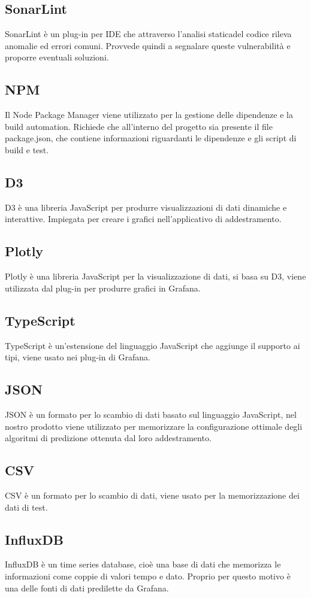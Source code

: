 	\subsection{SonarLint}
		SonarLint è un plug-in per IDE che attraverso l'analisi statica\glosp del codice rileva anomalie ed errori comuni. Provvede quindi a segnalare queste vulnerabilità e proporre eventuali soluzioni.
	\subsection{NPM}
		Il Node Package Manager viene utilizzato per la gestione delle dipendenze e la build automation.
		Richiede che all'interno del progetto sia presente il file package.json, che contiene informazioni riguardanti le dipendenze e gli script di build e test.
	\subsection{D3}
		D3 è una libreria JavaScript per produrre visualizzazioni di dati dinamiche e interattive. Impiegata per creare i grafici nell'applicativo di addestramento.
	\subsection{Plotly}
		Plotly è una libreria JavaScript per la visualizzazione di dati, si basa su D3, viene utilizzata dal plug-in per produrre grafici in Grafana\glo.
	\subsection{TypeScript}
		TypeScript è un'estensione del linguaggio JavaScript che aggiunge il supporto ai tipi, viene usato nei plug-in di Grafana\glo.
	\subsection{JSON}
		JSON è un formato per lo scambio di dati basato sul linguaggio JavaScript, nel nostro prodotto viene utilizzato per memorizzare la configurazione ottimale degli algoritmi di predizione ottenuta dal loro addestramento.
	\subsection{CSV}
		CSV è un formato per lo scambio di dati, viene usato per la memorizzazione dei dati di test.
	\subsection{InfluxDB}
		InfluxDB è un time series database, cioè una base di dati che memorizza le informazioni come coppie di valori tempo e dato. Proprio per questo motivo è una delle fonti di dati predilette da Grafana\glo.
